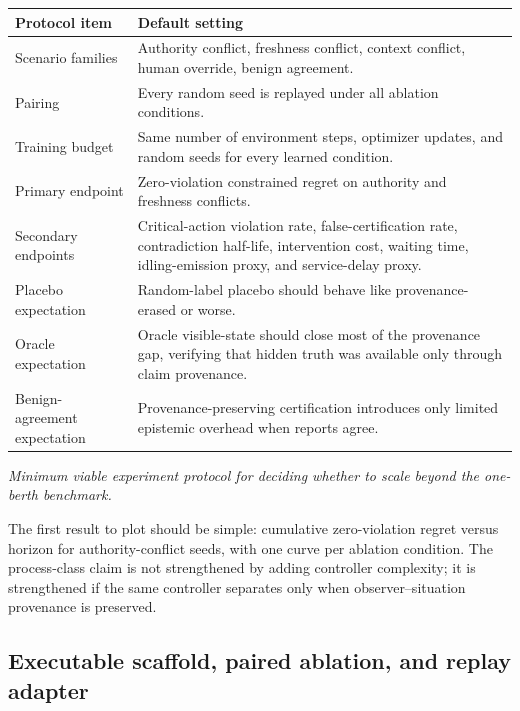 \documentclass[11pt]{article}
\newcommand{\1}{\mathbf{1}}
\theoremstyle{definition}
\theoremstyle{plain}
\theoremstyle{remark}
\begin{document}
\begin{center}
\small
\begin{tabularx}{\textwidth}{>{\raggedright\arraybackslash}p{}X}
\toprule
\textbf{Protocol item} & \textbf{Default setting} \\
\midrule
Scenario families & Authority conflict, freshness conflict, context conflict, human override, benign agreement. \\
Pairing & Every random seed is replayed under all ablation conditions. \\
Training budget & Same number of environment steps, optimizer updates, and random seeds for every learned condition. \\
Primary endpoint & Zero-violation constrained regret on authority and freshness conflicts. \\
Secondary endpoints & Critical-action violation rate, false-certification rate, contradiction half-life, intervention cost, waiting time, idling-emission proxy, and service-delay proxy. \\
Placebo expectation & Random-label placebo should behave like provenance-erased or worse. \\
Oracle expectation & Oracle visible-state should close most of the provenance gap, verifying that hidden truth was available only through claim provenance. \\
Benign-agreement expectation & Provenance-preserving certification introduces only limited epistemic overhead when reports agree. \\
\bottomrule
\end{tabularx}
\par\vspace{0.25em}
{\small\emph{Minimum viable experiment protocol for deciding whether to scale beyond the one-berth benchmark.}}
\end{center}

The first result to plot should be simple: cumulative zero-violation regret versus horizon for authority-conflict seeds, with one curve per ablation condition. The process-class claim is not strengthened by adding controller complexity; it is strengthened if the same controller separates only when observer--situation provenance is preserved.


\subsection{Executable scaffold, paired ablation, and replay adapter}
\label{supp:subsec:executable-scaffold}
\end{document}
